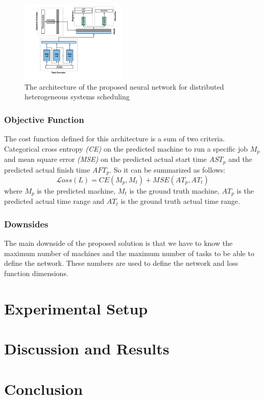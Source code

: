 \documentclass[twocolumn,11pt]{IEEEtran}
\begin{document}
\begin{figure}[hp]
    \centering
    \includegraphics[width=0.45\textwidth]{sched_nn}
    \caption{The architecture of the proposed neural network for distributed heterogeneous systems scheduling}
    \label{fig:nn}
\end{figure}
    
\subsubsection{Objective Function}
The cost function defined for this architecture is a sum of two criteria. Categorical cross entropy \emph{(CE)} on the predicted machine to run a specific job $M_p$ and mean square error \emph{(MSE)} on the predicted actual start time $AST_p$ and the predicted actual finish time $AFT_p$. So it can be summarized as follows:
\begin{equation}
\mathcal Loss(L) = CE(M_p, M_t) + MSE(AT_p, AT_t)
\end{equation}
where $M_p$ is the predicted machine, $M_t$ is the ground truth machine, $AT_p$ is the predicted actual time range and $AT_t$ is the ground truth actual time range.

\subsubsection{Downsides}
The main downside of the proposed solution is that we have to know the maximum number of machines and the maximum number of tasks to be able to define the network. These numbers are used to define the network and loss function dimensions. 
    
\section{Experimental Setup}

\section{Discussion and Results}

\section{Conclusion}

\medskip



    
\end{document}
